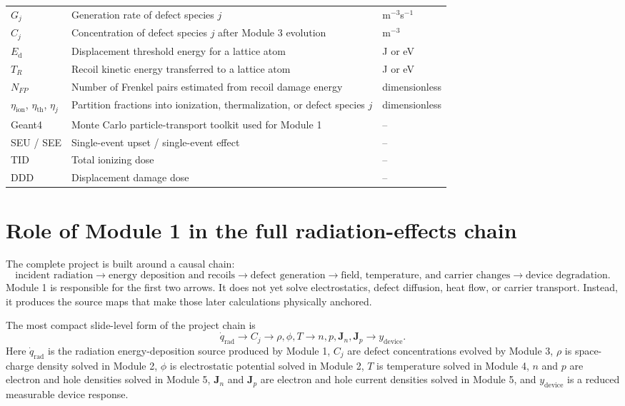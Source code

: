 \documentclass[11pt]{article}
\newcommand{\qrad}{\dot{q}_{\mathrm{rad}}}
\newcommand{\Ed}{E_{\mathrm{d}}}
\begin{document}
\begin{longtable}{p{} p{} p{}}
$G_j$ & Generation rate of defect species $j$ & m$^{-3}$s$^{-1}$ \\
$C_j$ & Concentration of defect species $j$ after Module 3 evolution & m$^{-3}$ \\
$\Ed$ & Displacement threshold energy for a lattice atom & J or eV \\
$T_R$ & Recoil kinetic energy transferred to a lattice atom & J or eV \\
$N_{FP}$ & Number of Frenkel pairs estimated from recoil damage energy & dimensionless \\
$\eta_{\mathrm{ion}}$, $\eta_{\mathrm{th}}$, $\eta_j$ & Partition fractions into ionization, thermalization, or defect species $j$ & dimensionless \\
Geant4 & Monte Carlo particle-transport toolkit used for Module 1 & -- \\
SEU / SEE & Single-event upset / single-event effect & -- \\
TID & Total ionizing dose & -- \\
DDD & Displacement damage dose & -- \\
\bottomrule
\end{longtable}

\section{Role of Module 1 in the full radiation-effects chain}

The complete project is built around a causal chain:
\begin{equation}
\text{incident radiation}
\longrightarrow
\text{energy deposition and recoils}
\longrightarrow
\text{defect generation}
\longrightarrow
\text{field, temperature, and carrier changes}
\longrightarrow
\text{device degradation}.
\end{equation}
Module 1 is responsible for the first two arrows. It does not yet solve electrostatics, defect diffusion, heat flow, or carrier transport. Instead, it produces the source maps that make those later calculations physically anchored.

The most compact slide-level form of the project chain is
\begin{equation}
\qrad
\longrightarrow
C_j
\longrightarrow
\rho,\phi,T
\longrightarrow
n,p,\mathbf{J}_n,\mathbf{J}_p
\longrightarrow
 y_{\mathrm{device}}.
\label{eq:project_chain_compact}
\end{equation}
Here $\qrad$ is the radiation energy-deposition source produced by Module 1, $C_j$ are defect concentrations evolved by Module 3, $\rho$ is space-charge density solved in Module 2, $\phi$ is electrostatic potential solved in Module 2, $T$ is temperature solved in Module 4, $n$ and $p$ are electron and hole densities solved in Module 5, $\mathbf{J}_n$ and $\mathbf{J}_p$ are electron and hole current densities solved in Module 5, and $y_{\mathrm{device}}$ is a reduced measurable device response.
\end{document}
